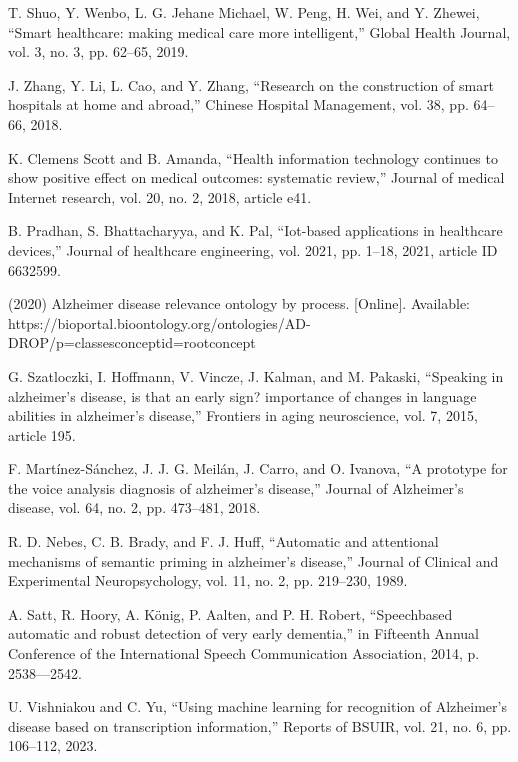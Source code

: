 \documentclass{scndocument}
\begin{document}
\begin{multicols*}{2}
\endgroup
\begin{enumerate}[label=\textbf{[\arabic*]}, noitemsep]
\ssmall
\item T. Shuo, Y. Wenbo, L. G. Jehane Michael, W. Peng, H. Wei, and Y. Zhewei, “Smart healthcare: making medical care more intelligent,” Global Health Journal, vol. 3, no. 3, pp. 62–65, 2019.
\item J. Zhang, Y. Li, L. Cao, and Y. Zhang, “Research on the construction of smart hospitals at home and abroad,” Chinese Hospital Management, vol. 38, pp. 64–66, 2018.
\item K. Clemens Scott and B. Amanda, “Health information technology continues to show positive effect on medical outcomes: systematic review,” Journal of medical Internet research, vol. 20, no. 2, 2018, article e41.
\item B. Pradhan, S. Bhattacharyya, and K. Pal, “Iot-based applications in healthcare devices,” Journal of healthcare engineering, vol. 2021, pp. 1–18, 2021, article ID 6632599.
\item (2020) Alzheimer disease relevance ontology by process. [Online]. Available: https://bioportal.bioontology.org/ontologies/AD-DROP/p=classesconceptid=rootconcept
\item G. Szatloczki, I. Hoffmann, V. Vincze, J. Kalman, and M. Pakaski, “Speaking in alzheimer’s disease, is that an early sign? importance of changes in language abilities in alzheimer’s disease,” Frontiers in aging neuroscience, vol. 7, 2015, article 195.
\item F. Martínez-Sánchez, J. J. G. Meilán, J. Carro, and O. Ivanova, “A prototype for the voice analysis diagnosis of alzheimer’s disease,” Journal of Alzheimer’s disease, vol. 64, no. 2, pp. 473–481, 2018.
\item R. D. Nebes, C. B. Brady, and F. J. Huff, “Automatic and attentional mechanisms of semantic priming in alzheimer’s disease,” Journal of Clinical and Experimental Neuropsychology, vol. 11, no. 2, pp. 219–230, 1989.
\item A. Satt, R. Hoory, A. König, P. Aalten, and P. H. Robert, “Speechbased automatic and robust detection of very early dementia,” in Fifteenth Annual Conference of the International Speech Communication Association, 2014, p. 2538––2542.
\item U. Vishniakou and C. Yu, “Using machine learning for recognition of Alzheimer’s disease based on transcription information,” Reports of BSUIR, vol. 21, no. 6, pp. 106–112, 2023.
\end{enumerate}



\end{multicols*}
\end{document}
